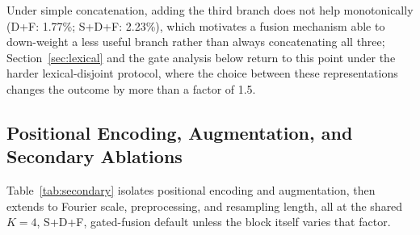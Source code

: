 \documentclass[runningheads]{llncs}
\begin{document}
Under simple concatenation, adding the third branch does not help monotonically (D+F: 1.77\%; S+D+F: 2.23\%), which motivates a fusion mechanism able to down-weight a less useful branch rather than always concatenating all three; Section~\ref{sec:lexical} and the gate analysis below return to this point under the harder lexical-disjoint protocol, where the choice between these representations changes the outcome by more than a factor of 1.5.

\subsection{Positional Encoding, Augmentation, and Secondary Ablations}
Table~\ref{tab:secondary} isolates positional encoding and augmentation, then extends to Fourier scale, preprocessing, and resampling length, all at the shared $K=4$, S+D+F, gated-fusion default unless the block itself varies that factor.
\end{document}
